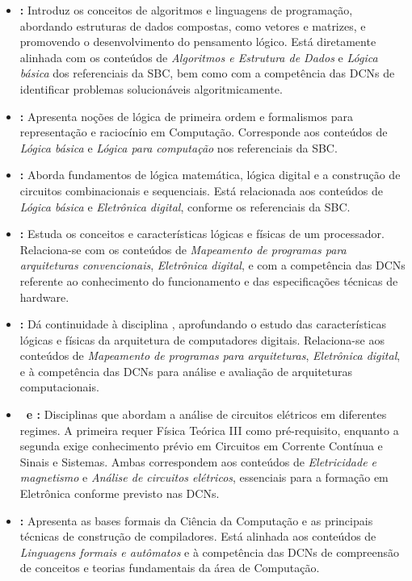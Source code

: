 \begin{itemize}
  \item \textbf{\AlgComp:} Introduz os conceitos de algoritmos e linguagens de programação, abordando estruturas de dados compostas, como vetores e matrizes, e promovendo o desenvolvimento do pensamento lógico. Está diretamente alinhada com os conteúdos de \textit{Algoritmos e Estrutura de Dados} e \textit{Lógica básica} dos referenciais da SBC, bem como com a competência das DCNs de identificar problemas solucionáveis algoritmicamente.

  \item \textbf{\LogProg:} Apresenta noções de lógica de primeira ordem e formalismos para representação e raciocínio em Computação. Corresponde aos conteúdos de \textit{Lógica básica} e \textit{Lógica para computação} nos referenciais da SBC.

  \item \textbf{\LogCircDig:} Aborda fundamentos de lógica matemática, lógica digital e a construção de circuitos combinacionais e sequenciais. Está relacionada aos conteúdos de \textit{Lógica básica} e \textit{Eletrônica digital}, conforme os referenciais da SBC.

  \item \textbf{\FundComp:} Estuda os conceitos e características lógicas e físicas de um processador. Relaciona-se com os conteúdos de \textit{Mapeamento de programas para arquiteturas convencionais}, \textit{Eletrônica digital}, e com a competência das DCNs referente ao conhecimento do funcionamento e das especificações técnicas de hardware.

  \item \textbf{\ArqComp:} Dá continuidade à disciplina \FundComp, aprofundando o estudo das características lógicas e físicas da arquitetura de computadores digitais. Relaciona-se aos conteúdos de \textit{Mapeamento de programas para arquiteturas}, \textit{Eletrônica digital}, e à competência das DCNs para análise e avaliação de arquiteturas computacionais.

  \item \textbf{\CCC~e \CCA:} Disciplinas que abordam a análise de circuitos elétricos em diferentes regimes. A primeira requer Física Teórica III como pré-requisito, enquanto a segunda exige conhecimento prévio em Circuitos em Corrente Contínua e Sinais e Sistemas. Ambas correspondem aos conteúdos de \textit{Eletricidade e magnetismo} e \textit{Análise de circuitos elétricos}, essenciais para a formação em Eletrônica conforme previsto nas DCNs.

  \item \textbf{\TeoComp:} Apresenta as bases formais da Ciência da Computação e as principais técnicas de construção de compiladores. Está alinhada aos conteúdos de \textit{Linguagens formais e autômatos} e à competência das DCNs de compreensão de conceitos e teorias fundamentais da área de Computação.
\end{itemize}

